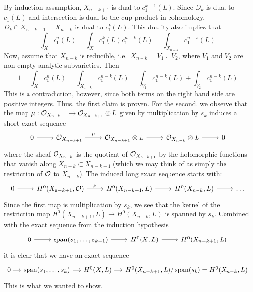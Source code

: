 \begin{myproof}
\begin{myproof}
		By induction assumption, $X_{n-k+1}$ is dual to $c_1^{k-1}(L)$. Since $D_k$ is dual to $c_1(L)$ and intersection is dual to the cup product in cohomology, $D_k\cap X_{n-k+1}=X_{n-k}$ is dual to $c_1^k(L)$. This duality also implies that
		\begin{equation*}
			\int_X c_1^n(L)=\int_X c_1^k(L)c_1^{n-k}(L)=\int_{X_{n-k}} c_1^{n-k}(L)
		\end{equation*}
		Now, assume that $X_{n-k}$ is reducible, i.e.~$X_{n-k}=V_1\cup V_2$, where $V_1$ and $V_2$ are non-empty analytic subvarieties. Then 
		\begin{equation*}
			1=\int_X c_1^n(L)=\int_{X_{n-k}}c_1^{n-k}(L)
			=\int_{V_1}c_1^{n-k}(L)+\int_{V_2}c_1^{n-k}(L)
		\end{equation*}
		This is a contradiction, however, since both terms on the right hand side are positive integers.
		Thus, the first claim is proven. For the second, we observe that the map $\mu:\mathcal{O}_{X_{n-k+1}}\to \mathcal{O}_{X_{n-k+1}}\otimes L$ given by multiplication by $s_k$ induces a short exact sequence
		\begin{equation*}
			\begin{tikzcd}
				0 \ar[r] & \mc O_{X_{n-k+1}} \ar[r,"\mu"] & \mc O_{X_{n-k+1}}\otimes L \ar[r] 
				& \mc O_{X_{n-k}}\otimes L \ar[r] & 0
			\end{tikzcd}
		\end{equation*}
		where the sheaf $\mathcal{O}_{X_{n-k}}$ is the quotient of $\mathcal{O}_{X_{n-k+1}}$ by the holomorphic functions that vanish along $X_{n-k}\subset X_{n-k+1}$ (which we may think of as simply the restriction of $\mathcal{O}$ to $X_{n-k}$). The induced long exact sequence starts with:
		\begin{equation*}
			\begin{tikzcd}
				0 \ar[r] & H^0(X_{n-k+1},\mc O) \ar[r,"\mu"] & H^0(X_{n-k+1},L)
				\ar[r] & H^0(X_{n-k},L) \ar[r] & \dots
			\end{tikzcd}
		\end{equation*}
		Since the first map is multiplication by $s_k$, we see that the kernel of the restriction map $H^0(X_{n-k+1},L)\to H^0(X_{n-k},L)$ is spanned by $s_k$. Combined with the exact sequence from the induction hypothesis
		\begin{equation*}
			\begin{tikzcd}
				0 \ar[r] & \Span(s_1,\dots,s_{k-1}) \ar[r] & H^0(X,L) \ar[r] & H^0(X_{n-k+1},L)
			\end{tikzcd}
		\end{equation*}
		it is clear that we have an exact sequence
		\begin{equation*}
			\begin{tikzcd}[column sep=small]
				0\! \ar[r] & \Span(s_1,\dots,s_k) \ar[r] & H^0(X,L) \ar[r] 
				& H^0(X_{n-k+1},L)/\Span(s_k)=H^0(X_{n-k},L)
			\end{tikzcd}
		\end{equation*}
		This is what we wanted to show.
	\end{myproof}
	

\end{myproof}
